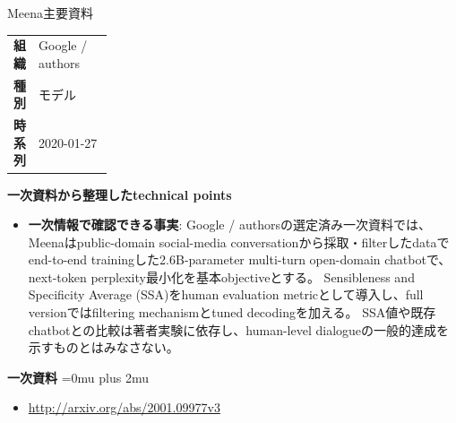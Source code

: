 \begin{technicalnote}{Meena}{主要資料}
\begingroup
\begin{tabularx}{\linewidth}{@{}>{\bfseries}p{0.22\linewidth}X@{}}
組織 & Google / authors \\
種別 & モデル \\
時系列 & 2020-01-27 \\
\end{tabularx}
\smallskip
\begin{minipage}{\linewidth}
{\bfseries 一次資料から整理したtechnical points}
\begin{itemize}[leftmargin=1.5em,itemsep=0.35em]
\item \textbf{一次情報で確認できる事実}: Google / authorsの選定済み一次資料では、Meenaはpublic-domain social-media conversationから採取・filterしたdataでend-to-end trainingした2.6B-parameter multi-turn open-domain chatbotで、next-token perplexity最小化を基本objectiveとする。 Sensibleness and Specificity Average (SSA)をhuman evaluation metricとして導入し、full versionではfiltering mechanismとtuned decodingを加える。 SSA値や既存chatbotとの比較は著者実験に依存し、human-level dialogueの一般的達成を示すものとはみなさない。
\end{itemize}
\begin{samepage}
{\bfseries 一次資料}
\begingroup\sloppy
\Urlmuskip=0mu plus 2mu\relax
\begin{itemize}[leftmargin=1.5em,itemsep=0.25em]
\item {\scriptsize\url{http://arxiv.org/abs/2001.09977v3}}
\end{itemize}
\endgroup
\end{samepage}
\end{minipage}
\endgroup
\end{technicalnote}
\medskip

